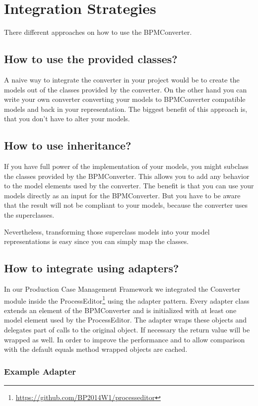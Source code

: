 \section{Integration Strategies}

There different approaches on how to use the BPMConverter.

\subsection{How to use the provided classes?}

A naive way to integrate the converter in your project would be to create the models out of the classes provided by the converter.
On the other hand you can write your own converter converting your models to BPMConverter compatible models and back in your representation.
The biggest benefit of this approach is, that you don't have to alter your models.

\subsection{How to use inheritance?}

If you have full power of the implementation of your models, you might subclass the classes provided by the BPMConverter.
This allows you to add any behavior to the model elements used by the converter.
The benefit is that you can use your models directly as an input for the BPMConverter.
But you have to be aware that the result will not be compliant to your models, because the converter uses the superclasses.

Nevertheless, transforming those superclass models into your model representations is easy since you can simply map the classes.

\subsection{How to integrate using adapters?}

In our Production Case Management Framework we integrated the Converter module inside the ProcessEditor\footnote{\url{https://github.com/BP2014W1/processeditor}} using the adapter pattern.
Every adapter class extends an element of the BPMConverter and is initialized with at least one model element used by the ProcessEditor.
The adapter wraps these objects and delegates part of calls to the original object.
If necessary the return value will be wrapped as well.
In order to improve the performance and to allow comparison with the default equals method wrapped objects are cached.

\subsubsection{Example Adapter}